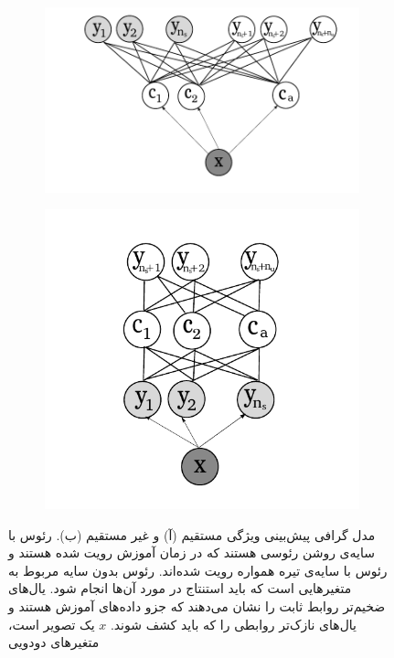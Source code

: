 \begin{figure}[!ht]
  \centering
  \begin{subfigure}[b]{0.47\linewidth}
    \includegraphics[width=\linewidth]{images/dap}
    \caption{}
    \label{fig:dap}
  \end{subfigure}
%
  \begin{subfigure}[b]{0.47\linewidth}
    \includegraphics[width=\linewidth]{images/iap}
    \caption{}
    \label{fig:iap}
  \end{subfigure}
  \caption[مدل گرافی پیش‌بینی ویژگی مستقیم و غیرمستقیم]{
  مدل گرافی پیش‌بینی ویژگی مستقیم (آ) و غیر مستقیم (ب). رئوس با سایه‌ی روشن رئوسی هستند که در زمان آموزش رویت شده هستند و رئوس با سایه‌ی تیره همواره رویت شده‌اند. رئوس بدون سایه مربوط به متغیرهایی است که باید استنتاج در مورد آن‌ها انجام شود. یال‌های ضخیم‌تر روابط ثابت را نشان می‌دهند که جزو داده‌های آموزش هستند و یال‌های نازک‌تر روابطی را که باید کشف شوند. $x$ یک تصویر است، متغیرهای دودویی
}
\end{figure}
